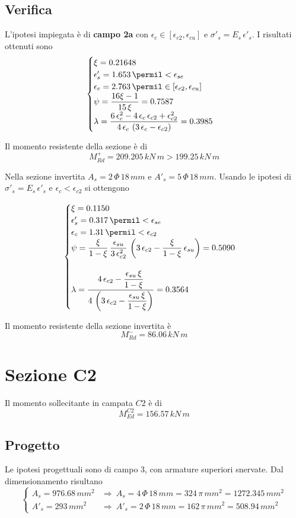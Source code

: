 \subsection{Verifica}
L'ipotesi impiegata è di \textbf{campo 2a} con $\epsilon_c \in \left[\epsilon_{c2}, \epsilon_{cu}\right]$ e $\sigma'_s = E_s\,\epsilon'_s$. I risultati ottenuti sono
\[
\begin{cases}
	\xi = 0.21648\\
	\epsilon'_s = 1.653\,\permil < \epsilon_{se}\\
	\epsilon_c = 2.763\,\permil \in \left[\epsilon_{c2}, \epsilon_{cu}\right]\\
	\psi = \dfrac{16\xi -1}{15\,\xi} =0.7587 \\
	\lambda = \dfrac{6\,\epsilon_{c}^2 - 4\,\epsilon_{c}\,\epsilon_{c2} + \epsilon_{c2}^2}{4\,\epsilon_{c}\,\left(3\,\epsilon_c - \epsilon_{c2}\right)} = 0.3985
\end{cases}
\]

Il momento resistente della sezione è di
\[
M_{Rd}^+ = 209.205\,kN\,m > 199.25\,kN\,m
\]

Nella sezione invertita $A_s = 2\,\Phi\,18\,mm$ e $A'_s = 5\,\Phi\,18\,mm$. Usando le ipotesi di $\sigma'_s = E_s\,\epsilon'_s$ e $\epsilon_c < \epsilon_{c2}$ si ottengono

\[
\begin{cases}
	\xi = 0.1150\\
	\epsilon'_s = 0.317\,\permil<\epsilon_{se}\\
	\epsilon_c = 1.31\,\permil < \epsilon_{c2}\\
	\psi = \dfrac{\xi}{1-\xi}\,\dfrac{\epsilon_{su}}{3\,\epsilon_{c2}^2}\,\left(3\,\epsilon_{c2} - \dfrac{\xi}{1-\xi}\,\epsilon_{su}\right) = 0.5090\\\\
	\lambda = \dfrac{4\,\epsilon_{c2} - \dfrac{\epsilon_{su}\,\xi}{1-\xi}}{4\,\left(3\,\epsilon_{c2} - \dfrac{\epsilon_{su}\,\xi}{1-\xi}\right)} = 0.3564
\end{cases}
\]

Il momento resistente della sezione invertita è
\[
M_{Rd}^- = 86.06\,kN\,m
\]

\section{Sezione C2}
Il momento sollecitante in campata $C2$ è di 
\[
M_{Ed}^{C2} = 156.57\,kN\,m
\]
\subsection{Progetto}
Le ipotesi progettuali sono di campo 3, con armature superiori snervate. Dal dimensionamento risultano
\[
\begin{cases}
	A_s = 976.68\,mm^2 &\Longrightarrow~A_s = 4\,\Phi\,18\,mm = 324\,\pi\,mm^2 = 1272.345\,mm^2\\
	A'_s = 293\,mm^2 &\Longrightarrow~ A'_s = 2\,\Phi\,18\,mm = 162\,\pi\,mm^2 = 508.94\,mm^2
\end{cases}
\]

